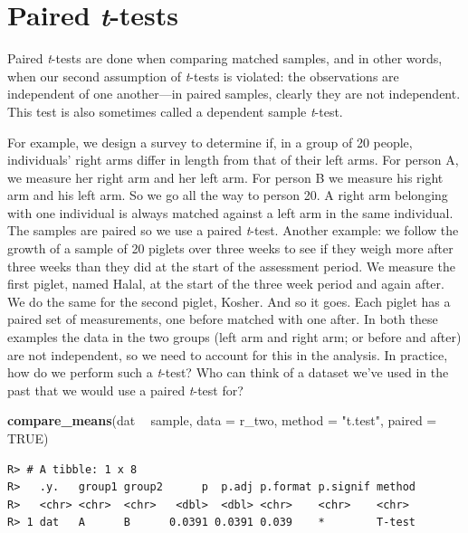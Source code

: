 \documentclass[english,10pt,a4paper,oneside]{book}
\newenvironment{Shaded}{\begin{snugshade}}{\end{snugshade}}
\newcommand{\KeywordTok}[1]{\textcolor[rgb]{0.13,0.29,0.53}{\textbf{#1}}}
\newcommand{\DataTypeTok}[1]{\textcolor[rgb]{0.13,0.29,0.53}{#1}}
\newcommand{\StringTok}[1]{\textcolor[rgb]{0.31,0.60,0.02}{#1}}
\newcommand{\OtherTok}[1]{\textcolor[rgb]{0.56,0.35,0.01}{#1}}
\newcommand{\OperatorTok}[1]{\textcolor[rgb]{0.81,0.36,0.00}{\textbf{#1}}}
\newcommand{\NormalTok}[1]{#1}
\theoremstyle{definition}
\theoremstyle{definition}
\theoremstyle{definition}
\theoremstyle{remark}
\begin{document}
\section{\texorpdfstring{Paired
\emph{t}-tests}{Paired t-tests}}\label{paired-t-tests}

Paired \emph{t}-tests are done when comparing matched samples, and in
other words, when our second assumption of \emph{t}-tests is violated:
the observations are independent of one another---in paired samples,
clearly they are not independent. This test is also sometimes called a
dependent sample \emph{t}-test.

For example, we design a survey to determine if, in a group of 20
people, individuals' right arms differ in length from that of their left
arms. For person A, we measure her right arm and her left arm. For
person B we measure his right arm and his left arm. So we go all the way
to person 20. A right arm belonging with one individual is always
matched against a left arm in the same individual. The samples are
paired so we use a paired \emph{t}-test. Another example: we follow the
growth of a sample of 20 piglets over three weeks to see if they weigh
more after three weeks than they did at the start of the assessment
period. We measure the first piglet, named Halal, at the start of the
three week period and again after. We do the same for the second piglet,
Kosher. And so it goes. Each piglet has a paired set of measurements,
one before matched with one after. In both these examples the data in
the two groups (left arm and right arm; or before and after) are not
independent, so we need to account for this in the analysis. In
practice, how do we perform such a \emph{t}-test? Who can think of a
dataset we've used in the past that we would use a paired \emph{t}-test
for?

\begin{Shaded}
\begin{Highlighting}[]
\KeywordTok{compare_means}\NormalTok{(dat }\OperatorTok{~}\StringTok{ }\NormalTok{sample, }\DataTypeTok{data =}\NormalTok{ r_two, }\DataTypeTok{method =} \StringTok{"t.test"}\NormalTok{, }\DataTypeTok{paired =} \OtherTok{TRUE}\NormalTok{)}
\end{Highlighting}
\end{Shaded}

\begin{verbatim}
R> # A tibble: 1 x 8
R>   .y.   group1 group2      p  p.adj p.format p.signif method
R>   <chr> <chr>  <chr>   <dbl>  <dbl> <chr>    <chr>    <chr> 
R> 1 dat   A      B      0.0391 0.0391 0.039    *        T-test
\end{verbatim}
\end{document}
